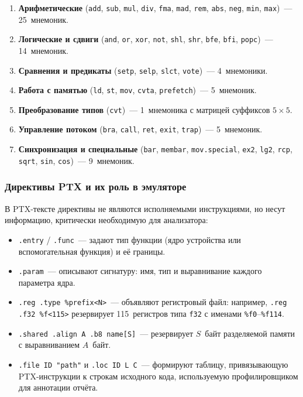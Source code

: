 \begin{enumerate}
  \item \textbf{Арифметические} (\texttt{add}, \texttt{sub}, \texttt{mul},
        \texttt{div}, \texttt{fma}, \texttt{mad}, \texttt{rem}, \texttt{abs},
        \texttt{neg}, \texttt{min}, \texttt{max})~--- 25~мнемоник.
  \item \textbf{Логические и сдвиги} (\texttt{and}, \texttt{or},
        \texttt{xor}, \texttt{not}, \texttt{shl}, \texttt{shr},
        \texttt{bfe}, \texttt{bfi}, \texttt{popc})~--- 14~мнемоник.
  \item \textbf{Сравнения и предикаты} (\texttt{setp}, \texttt{selp},
        \texttt{slct}, \texttt{vote})~--- 4~мнемоники.
  \item \textbf{Работа с памятью} (\texttt{ld}, \texttt{st},
        \texttt{mov}, \texttt{cvta}, \texttt{prefetch})~--- 5~мнемоник.
  \item \textbf{Преобразование типов} (\texttt{cvt})~--- 1~мнемоника
        с матрицей суффиксов $5 \times 5$.
  \item \textbf{Управление потоком} (\texttt{bra}, \texttt{call},
        \texttt{ret}, \texttt{exit}, \texttt{trap})~--- 5~мнемоник.
  \item \textbf{Синхронизация и специальные} (\texttt{bar}, \texttt{membar},
        \texttt{mov.special}, \texttt{ex2}, \texttt{lg2},
        \texttt{rcp}, \texttt{sqrt}, \texttt{sin}, \texttt{cos})~--- 9~мнемоник.
\end{enumerate}

\subsubsection{Директивы PTX и их роль в эмуляторе}

В PTX-тексте директивы не являются исполняемыми инструкциями,
но несут информацию, критически необходимую для анализатора:

\begin{itemize}
  \item \texttt{.entry} / \texttt{.func}~--- задают тип функции
        (ядро устройства или вспомогательная функция) и её границы.
  \item \texttt{.param}~--- описывают сигнатуру: имя, тип и выравнивание
        каждого параметра ядра.
  \item \texttt{.reg .type \%prefix<N>}~--- объявляют регистровый файл:
        например, \texttt{.reg .f32 \%f<115>} резервирует 115~регистров
        типа \texttt{f32} с именами \texttt{\%f0}--\texttt{\%f114}.
  \item \texttt{.shared .align A .b8 name[S]}~--- резервирует $S$~байт
        разделяемой памяти с выравниванием $A$~байт.
  \item \texttt{.file ID "path"} и \texttt{.loc ID L C}~--- формируют
        таблицу, привязывающую PTX-инструкции к строкам исходного кода,
        используемую профилировщиком для аннотации отчёта.
\end{itemize}

